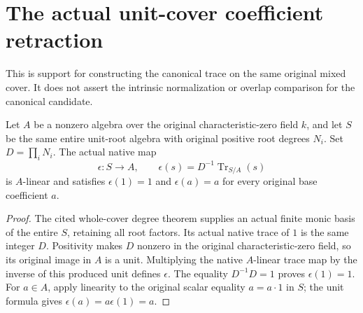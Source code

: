 \section{The actual unit-cover coefficient retraction}

This is support for constructing the canonical trace on the same original
mixed cover.  It does not assert the intrinsic normalization or overlap
comparison for the canonical candidate.

\begin{lemma}
\label{lem:kn-global-trace-unit-coefficient-retraction}
\leanok
Let $A$ be a nonzero algebra over the original characteristic-zero field
$k$, and let $S$ be the same entire unit-root algebra with original
positive root degrees $N_i$.  Set $D=\prod_iN_i$.  The actual native map
\[
 \epsilon:S\longrightarrow A,\qquad
 \epsilon(s)=D^{-1}\operatorname{Tr}_{S/A}(s)
\]
is $A$-linear and satisfies $\epsilon(1)=1$ and
$\epsilon(a)=a$ for every original base coefficient $a$.
\end{lemma}
\begin{proof}
The cited whole-cover degree theorem supplies an actual finite monic
basis of the entire $S$, retaining all root factors.  Its actual native
trace of $1$ is the same integer $D$.  Positivity makes $D$ nonzero in
the original characteristic-zero field, so its original image in $A$
is a unit.  Multiplying the native $A$-linear trace map by the inverse
of this produced unit defines $\epsilon$.  The equality
$D^{-1}D=1$ proves $\epsilon(1)=1$.  For $a\in A$, apply linearity to
the original scalar equality $a=a\cdot1$ in $S$; the unit formula gives
$\epsilon(a)=a\epsilon(1)=a$.
\end{proof}

